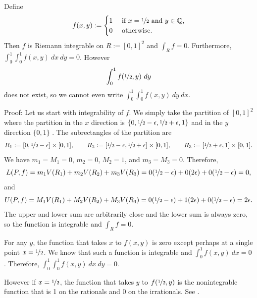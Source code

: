 \begin{example}
Define 
\begin{equation*}
f(x,y) := 
\begin{cases}
1 & \text{ if $x=\nicefrac{1}{2}$ and $y \in {\mathbb{Q}}$,} \\
0 & \text{ otherwise.}
\end{cases}
\end{equation*}
Then $f$ is Riemann integrable on $R := [0,1]^2$ and $\int_R f = 0$.
Furthermore, $\int_0^1 \int_0^1 f(x,y) ~ dx ~ dy = 0$.
However
\begin{equation*}
\int_0^1 f(\nicefrac{1}{2},y) ~ dy
\end{equation*}
does not exist, so we cannot even write $\int_0^1 \int_0^1 f(x,y) ~ dy ~ dx$.

Proof:
Let us start with integrability of $f$.  We simply take the partition
of $[0,1]^2$ where the partition in the $x$ direction is
$\{ 0, \nicefrac{1}{2}-\epsilon,
\nicefrac{1}{2}+\epsilon,1\}$ and in the $y$ direction $\{ 0, 1 \}$ .
The subrectangles of the partition are
\begin{equation*}
R_1 := [0,
\nicefrac{1}{2}-\epsilon] \times [0,1],
\qquad
R_2 := [\nicefrac{1}{2}-\epsilon,
\nicefrac{1}{2}+\epsilon] \times [0,1],
\qquad
R_3 := [\nicefrac{1}{2}+\epsilon,1] \times [0,1] .
\end{equation*}
We have $m_1 = M_1 = 0$, $m_2 =0$, $M_2 = 1$, and $m_3 = M_3 = 0$.
Therefore,
\begin{equation*}
L(P,f) = 
m_1 V(R_1)
+
m_2 V(R_2)
+
m_3 V(R_3)
=
0 (\nicefrac{1}{2}-\epsilon)
+
0 (2\epsilon)
+
0 (\nicefrac{1}{2}-\epsilon) = 0 ,
\end{equation*}
and
\begin{equation*}
U(P,f) = 
M_1 V(R_1)
+
M_2 V(R_2)
+
M_3 V(R_3)
=
0 (\nicefrac{1}{2}-\epsilon)
+
1 (2\epsilon)
+
0 (\nicefrac{1}{2}-\epsilon) = 2 \epsilon .
\end{equation*}
The upper and lower sum are arbitrarily close and the lower sum is always
zero, so the function is integrable and $\int_R f = 0$.

For any $y$, the function that takes $x$ to $f(x,y)$ is zero except
perhaps at a single point $x=\nicefrac{1}{2}$.  We know that such a
function is integrable and $\int_0^1 f(x,y) ~ dx = 0$.  Therefore,
$\int_0^1 \int_0^1 f(x,y) ~ dx ~ dy = 0$.

However if $x=\nicefrac{1}{2}$, the function that takes $y$ to
$f(\nicefrac{1}{2},y)$ is the nonintegrable function that is
1 on the rationals and 0 on the irrationals.
See .
\end{example}

